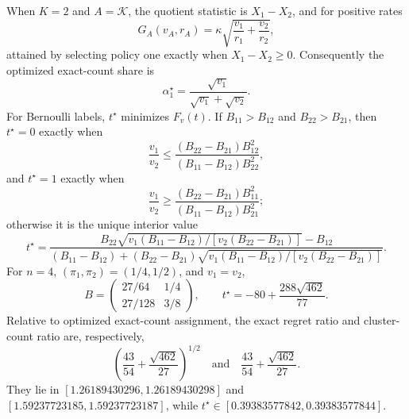 When \(K=2\) and \(A=\mathcal K\), the quotient statistic is \(X_1-X_2\), and for positive rates
\[
G_A(v_A,r_A)=\kappa\sqrt{\frac{v_1}{r_1}+\frac{v_2}{r_2}},
\]
attained by selecting policy one exactly when \(X_1-X_2\geq0\).  Consequently the optimized exact-count share is
\[
\alpha_1^\star=\frac{\sqrt{v_1}}{\sqrt{v_1}+\sqrt{v_2}}.
\]
For Bernoulli labels, \(t^\star\) minimizes \(F_v(t)\).  If \(B_{11}>B_{12}\) and \(B_{22}>B_{21}\), then \(t^\star=0\) exactly when
\[
\frac{v_1}{v_2}\leq\frac{(B_{22}-B_{21})B_{12}^2}{(B_{11}-B_{12})B_{22}^2},
\]
and \(t^\star=1\) exactly when
\[
\frac{v_1}{v_2}\geq\frac{(B_{22}-B_{21})B_{11}^2}{(B_{11}-B_{12})B_{21}^2};
\]
otherwise it is the unique interior value
\[
t^\star=
\frac{B_{22}\sqrt{v_1(B_{11}-B_{12})/[v_2(B_{22}-B_{21})]}-B_{12}}
{(B_{11}-B_{12})+(B_{22}-B_{21})\sqrt{v_1(B_{11}-B_{12})/[v_2(B_{22}-B_{21})]}}.
\]
For \(n=4\), \((\pi_1,\pi_2)=(1/4,1/2)\), and \(v_1=v_2\),
\[
B=\begin{pmatrix}27/64&1/4\\27/128&3/8\end{pmatrix},\qquad
t^\star=-80+\frac{288\sqrt{462}}{77}.
\]
Relative to optimized exact-count assignment, the exact regret ratio and cluster-count ratio are, respectively,
\[
\left(\frac{43}{54}+\frac{\sqrt{462}}{27}\right)^{1/2}
\quad\text{and}\quad
\frac{43}{54}+\frac{\sqrt{462}}{27}.
\]
They lie in \([1.26189430296,1.26189430298]\) and \([1.59237723185,1.59237723187]\), while \(t^\star\in[0.39383577842,0.39383577844]\).